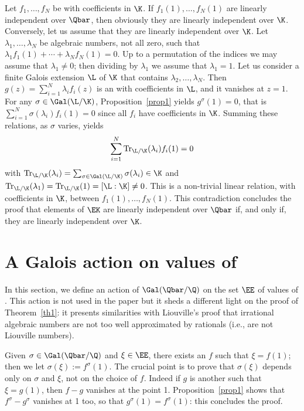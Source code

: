 Let $f_1,\ldots,f_N$ be \Efunctions with coefficients in $\K$. If $f_1(1),\ldots,f_N(1)$ are linearly independent over $\Qbar$, then obviously they are linearly independent over $\K$. Conversely, let us assume that they are linearly independent over $\K$. Let $\lambda_1,\ldots,\lambda_N$ be algebraic numbers, not all zero, such that $ \lambda_1 f_1(1) + \cdots + \lambda_N f_N(1)=0$. Up to a permutation of the indices we may assume that $\lambda_1\neq 0$; then dividing by $\lambda_1$ we assume that $\lambda_1=1$. Let us consider a finite Galois extension $\L$ of $\K$ that contains
$\lambda_2,\ldots,\lambda_N$. Then $g(z) = \sum_{i=1}^N \lambda_i f_i(z)$ is an \Efunction with coefficients in $\L$, and it vanishes at $z=1$. For any $\sigma\in\Gal(\L/\K)$, Proposition~\ref{prop1} yields $g^\sigma(1)=0$, that is $\sum_{i=1}^N \sigma(\lambda_i) f_i(1)=0$ since all $f_i$ have coefficients in $\K$. Summing these relations, as $\sigma$ varies, yields\vspace*{-3pt}
\[
\sum_{i=1}^N {\rm Tr}_{\L/\K} (\lambda_i) f_i(1)=0
\]
with $ {\rm Tr}_{\L/\K} (\lambda_i) = \sum_{\sigma\in\Gal(\L/\K)} \sigma(\lambda_i) \in \K$ and $ {\rm Tr}_{\L/\K} (\lambda_1 ) = {\rm Tr}_{\L/\K} (1) = [\L:\K]\neq 0$. This is a non-trivial linear relation, with coefficients in $\K$, between $f_1(1),\ldots,f_N(1)$. This contradiction concludes the proof that elements of $\EK$ are linearly independent over $\Qbar$ if, and only if, they are linearly independent over $\K$.

\section{A Galois action on values of \texorpdfstring{\protect\Efunctions}{Ef}} \label{secGalois}

In this section, we define an action of $\Gal(\Qbar/\Q)$ on the set $\EE$ of values of \Efunctions.
This action is not used in the paper but it sheds a different light on the proof of Theorem~\ref{th1}: it presents similarities with Liouville's proof that irrational algebraic numbers are not too well approximated by rationals (i.e., are not Liouville numbers).

Given $\sigma\in \Gal(\Qbar/\Q)$ and $\xi\in\EE$, there exists an \Efunction $f$ such that $\xi=f(1)$; then we let $\sigma(\xi) := f^\sigma(1)$. The crucial point is to prove that $\sigma(\xi) $ depends only on $\sigma $ and $\xi$, not on the choice of $f$. Indeed if $g$ is another \Efunction such that $\xi=g(1)$, then $f-g$ vanishes at the point 1. Proposition~\ref{prop1} shows that $f^\sigma-g^\sigma$ vanishes at 1 too, so that $ g^\sigma(1)= f^\sigma(1)$: this concludes the proof.

